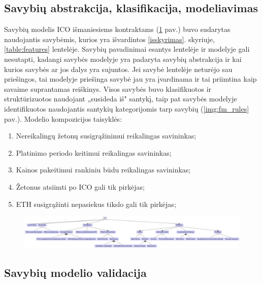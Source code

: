 \documentclass{VUMIFPSkursinis}
\begin{document}
\subsection{Savybių abstrakcija, klasifikacija, modeliavimas} \label{modelis}

Savybių modelis ICO išmaniesiems kontraktams (\ref{img:fm_ico} pav.) buvo sudarytas naudojantis savybėmis, kurios yra išvardintos \ref{isskyrimas}. skyriuje, \ref{table:features} lentelėje. Savybių pavadinimai esantys lentelėje ir modelyje gali nesutapti, kadangi savybės modelyje yra padaryta savybių abstrakcija ir kai kurios savybės ar jos dalys yra sujuntos. Jei savybė lentelėje neturėjo sau priešingos, tai modelyje priešinga savybė jau yra įvardinama ir tai priimtina kaip savaime suprantamas reiškinys. Visos savybės buvo klasifikuotos ir struktūrizuotos naudojant „susideda iš" santykį, taip pat savybės modelyje identifikuotos naudojantis santykių kategorijomis tarp savybių (\ref{img:fm_rules} pav.). Modelio kompozicijos taisyklės:
\begin{enumerate}
\item Nereikalingų žetonų susigrąžinimui reikalingas savininkas;
\item Platinimo periodo keitimui reikalingas savininkas;
\item Kainos pakeitimui rankiniu būdu reikalingas savininkas;
\item Žetonus atsiimti po ICO gali tik pirkėjas;
\item ETH susigrąžinti nepasiekus tikslo gali tik pirkėjas;
\end{enumerate}


\begin{figure}

\begin{center}
    \includegraphics[scale=0.5]{img/ico_model}
    \label{img:fm_ico}
\end{center}

\end{figure}
\pagebreak

\subsection{Savybių modelio validacija} \label{validacija}
\end{document}
